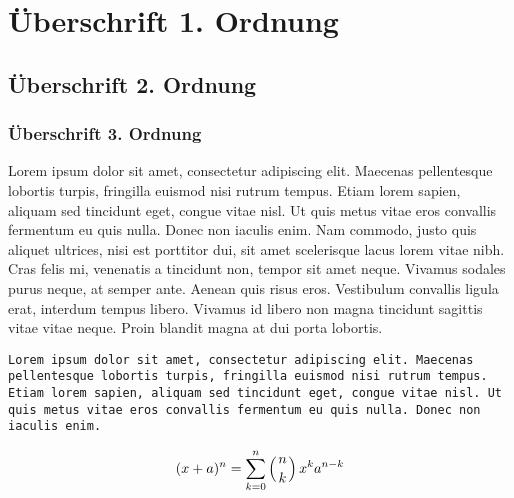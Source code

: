 \documentclass[11pt,ngerman]{scrartcl}
\begin{document}
 
\section{Überschrift 1. Ordnung}
\subsection{Überschrift 2. Ordnung}
\subsubsection{Überschrift 3. Ordnung}
 
Lorem ipsum dolor sit amet, consectetur adipiscing elit. Maecenas pellentesque lobortis turpis, fringilla euismod nisi rutrum tempus. Etiam lorem sapien, aliquam sed tincidunt eget, congue vitae nisl. Ut quis metus vitae eros convallis fermentum eu quis nulla. Donec non iaculis enim. Nam commodo, justo quis aliquet ultrices, nisi est porttitor dui, sit amet scelerisque lacus lorem vitae nibh. Cras felis mi, venenatis a tincidunt non, tempor sit amet neque. Vivamus sodales purus neque, at semper ante. Aenean quis risus eros. Vestibulum convallis ligula erat, interdum tempus libero. Vivamus id libero non magna tincidunt sagittis vitae vitae neque. Proin blandit magna at dui porta lobortis. 
 
\texttt{Lorem ipsum dolor sit amet, consectetur adipiscing elit. Maecenas pellentesque lobortis turpis, fringilla euismod nisi rutrum tempus. Etiam lorem sapien, aliquam sed tincidunt eget, congue vitae nisl. Ut quis metus vitae eros convallis fermentum eu quis nulla. Donec non iaculis enim.}
 
\begin{equation}
(x+a)^n = \sum_{k=0}^n \left(n\atop k \right) x^k a^{n-k}
\end{equation} 
 
\end{document}
